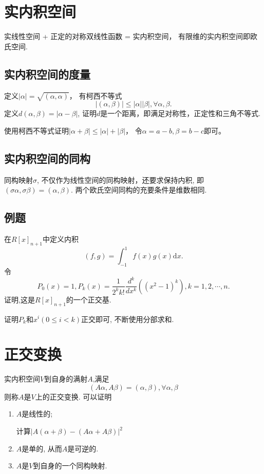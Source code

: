 \section{实内积空间}
实线性空间 + 正定的对称双线性函数 = 实内积空间，
有限维的实内积空间即欧氏空间.

\subsection{实内积空间的度量}
定义$|\alpha| = \sqrt{(\alpha, \alpha)}$，
有柯西不等式
$$|(\alpha,\beta)| \le |\alpha| |\beta|, \forall \alpha, \beta.$$
定义$d(\alpha, \beta) = |\alpha - \beta|$,
证明$d$是一个距离，即满足对称性，正定性和三角不等式.

\begin{solution}
    使用柯西不等式证明$|\alpha + \beta| \le |\alpha| + |\beta|$，
    令$\alpha = a - b, \beta = b - c$即可。
\end{solution}

\subsection{实内积空间的同构}
同构映射$\sigma$, 不仅作为线性空间的同构映射，还要求保持内积, 即
$(\sigma \alpha, \sigma \beta) = (\alpha, \beta)$.
两个欧氏空间同构的充要条件是维数相同.

\subsection{例题}
在$R[x]_{n+1}$中定义内积
$$(f,g) = \int^{1}_{-1}f(x)g(x) \mathrm{d}x.$$
令
$$P_0(x) = 1, P_k(x) = \frac{1}{2^k k!} \frac{d^k}{dx^k} ((x^2-1)^k), k = 1,2,\cdots,n.$$
证明,这是$R[x]_{n+1}$的一个正交基.

\begin{solution}
    证明$P_k$和$x^i(0\le i < k)$正交即可, 不断使用分部求和.
\end{solution}

\section{正交变换}
实内积空间$V$到自身的满射$A$,满足
$$(A\alpha, A\beta) = (\alpha, \beta), \forall \alpha, \beta$$
则称$A$是$V$上的正交变换.
可以证明
\begin{enumerate}
\item $A$是线性的;

\begin{solution}
    计算$|A(\alpha + \beta) - (A\alpha + A\beta)|^2$
\end{solution}
\item $A$是单的, 从而$A$是可逆的.
\item $A$是$V$到自身的一个同构映射.
\end{enumerate}

